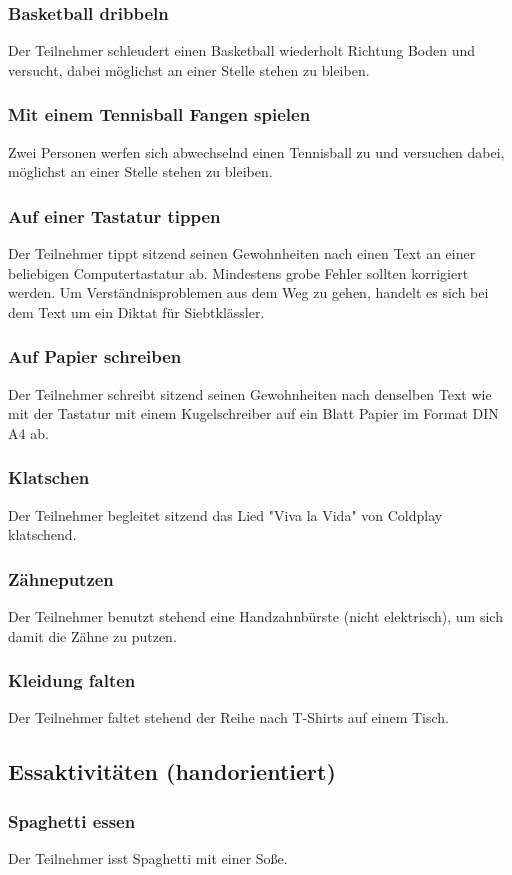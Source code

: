 \subsubsection{Basketball dribbeln}
Der Teilnehmer schleudert einen Basketball wiederholt Richtung Boden und versucht, dabei möglichst an einer Stelle stehen zu bleiben.
\subsubsection{Mit einem Tennisball Fangen spielen}
Zwei Personen werfen sich abwechselnd einen Tennisball zu und versuchen dabei, möglichst an einer Stelle stehen zu bleiben.
\subsubsection{Auf einer Tastatur tippen}
Der Teilnehmer tippt sitzend seinen Gewohnheiten nach einen Text an einer beliebigen Computertastatur ab. Mindestens grobe Fehler sollten korrigiert werden. Um Verständnisproblemen aus dem Weg zu gehen, handelt es sich bei dem Text um ein Diktat für Siebtklässler.
\subsubsection{Auf Papier schreiben}
Der Teilnehmer schreibt sitzend seinen Gewohnheiten nach denselben Text wie mit der Tastatur mit einem Kugelschreiber auf ein Blatt Papier im Format DIN A4 ab.
\subsubsection{Klatschen}
Der Teilnehmer begleitet sitzend das Lied "Viva la Vida" von Coldplay klatschend.
\subsubsection{Zähneputzen}
Der Teilnehmer benutzt stehend eine Handzahnbürste (nicht elektrisch), um sich damit die Zähne zu putzen.
\subsubsection{Kleidung falten}
Der Teilnehmer faltet stehend der Reihe nach T-Shirts auf einem Tisch.

\subsection{Essaktivitäten (handorientiert)}
\subsubsection{Spaghetti essen}
Der Teilnehmer isst Spaghetti mit einer Soße.

